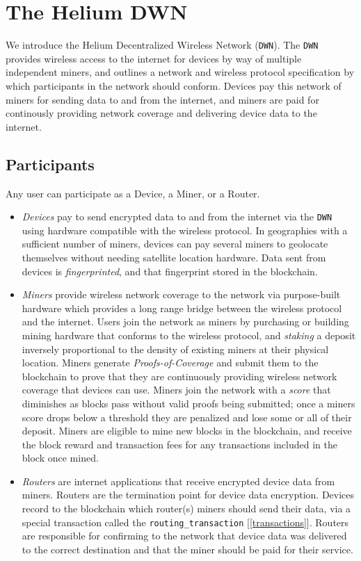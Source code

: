 \documentclass[letterpaper,11pt]{article}
\begin{document}
\newpage

\section{The Helium DWN}

We introduce the Helium Decentralized Wireless Network (\verb|DWN|). The \verb|DWN| provides wireless access to the internet for devices by way of multiple independent miners, and outlines a network and wireless protocol specification by which participants in the network should conform. Devices pay this network of miners for sending data to and from the internet, and miners are paid for continously providing network coverage and delivering device data to the internet.

\subsection{Participants}

Any user can participate as a Device, a Miner, or a Router.

\begin{itemize}
	\item \textit{Devices} pay to send encrypted data to and from the internet via the \verb|DWN| using hardware compatible with the wireless protocol. In geographies with a sufficient number of miners, devices can pay several miners to geolocate themselves without needing satellite location hardware. Data sent from devices is \textit{fingerprinted}, and that fingerprint stored in the blockchain.
	\item \textit{Miners} provide wireless network coverage to the network via purpose-built hardware which provides a long range bridge between the wireless protocol and the internet. Users join the network as miners by purchasing or building mining hardware that conforms to the wireless protocol, and \textit{staking} a deposit inversely proportional to the density of existing miners at their physical location. Miners generate \textit{Proofs-of-Coverage} and submit them to the blockchain to prove that they are continuously providing wireless network coverage that devices can use. Miners join the network with a \textit{score} that diminishes as blocks pass without valid proofs being submitted; once a miners score drops below a threshold they are penalized and lose some or all of their deposit. Miners are eligible to mine new blocks in the blockchain, and receive the block reward and transaction fees for any transactions included in the block once mined.
	\item \textit{Routers} are internet applications that receive encrypted device data from miners. Routers are the termination point for device data encryption. Devices record to the blockchain which router(s) miners should send their data, via a special transaction called the \verb|routing_transaction| [\ref{transactions}]. Routers are responsible for confirming to the network that device data was delivered to the correct destination and that the miner should be paid for their service.
\end{itemize}
\end{document}
